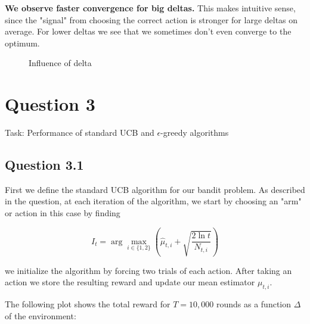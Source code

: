 \documentclass[a4paper, 11pt]{article} %
\begin{document}
\textbf{We observe faster convergence for big deltas.} This makes intuitive sense, since the "signal" from choosing the correct action is stronger for large deltas on average. For lower deltas we see that we sometimes don't even converge to the optimum.

   \begin{figure}[!htb]
        \caption{\label{fig:my-label} Influence of delta}
      \end{figure}

\newpage

\section*{Question 3}

Task: Performance of standard UCB and $\epsilon$-greedy algorithms

\subsection*{Question 3.1}

First we define the standard UCB algorithm for our bandit problem. As described in the question, at each iteration of the algorithm, we start by choosing an "arm" or action in this case by finding

$$I_{t}=\arg \max _{i \in\{1,2\}}\left(\widehat{\mu}_{t, i}+\sqrt{\frac{2 \ln t}{N_{t, i}}}\right)$$

we initialize the algorithm by forcing two trials of each action. After taking an action we store the resulting reward and update our mean estimator $\mu_{t,i}$.

The following plot shows the total reward for $T=10,000$ rounds as a function $\Delta$ of the environment:
\end{document}
